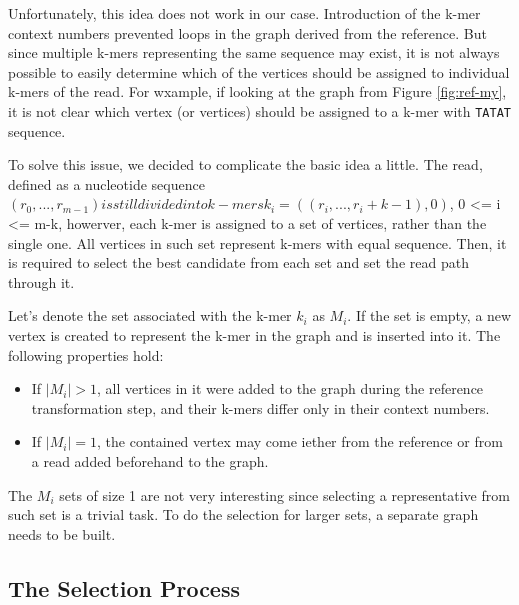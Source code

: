Unfortunately, this idea does not work in our case. Introduction of the k-mer context numbers prevented loops in the graph derived from the reference. But since multiple k-mers representing the same sequence may exist, it is not always possible to easily determine which of the vertices should be assigned to individual k-mers of the read. For wxample, if looking at the graph from Figure \ref{fig:ref-my}, it is not clear which vertex (or vertices) should be assigned to a k-mer with \texttt{TATAT} sequence. 

To solve this issue, we decided to complicate the basic idea a little. The read, defined as a nucleotide sequence $(r_0, ..., r_{m-1}) is still divided into k-mers k_{i} = ((r_i, ..., r_i+k-1), 0)$, 0 <= i <= m-k, howerver, each k-mer is assigned to a set of vertices, rather than the single one. All vertices in such set represent k-mers with equal sequence. Then, it is required to select the best candidate from each set and set the read path through it.

Let's denote the set associated with the k-mer $k_{i}$ as $M_{i}$. If the set is empty, a new vertex is created to represent the k-mer in the graph and is inserted into it. The following properties hold:
\begin{itemize}
\item If $|M_{i}| > 1$, all vertices in it were added to the graph during the reference transformation step, and their k-mers differ only in their context numbers.
\item If $|M_{i}| = 1$, the contained vertex may come iether from the reference or from a read added beforehand to the graph.
\end{itemize}

The $M_i$ sets of size 1 are not very interesting since selecting a representative from such set is a trivial task. To do the selection for larger sets, a separate graph needs to be built.

\subsection{The Selection Process}


